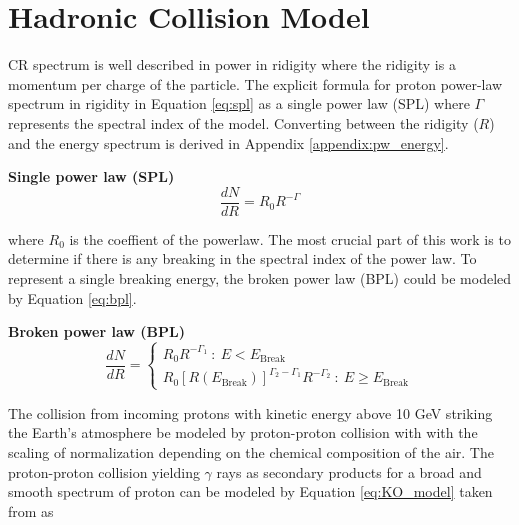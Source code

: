 \section{Hadronic Collision Model}
CR spectrum is well described in power in ridigity where 
the ridigity is a momentum per charge of the particle.
The explicit formula for proton power-law spectrum in rigidity
in Equation \ref{eq:spl} as a single power law (SPL)
where $\Gamma$ represents the spectral index of the model. 
Converting between the ridigity ($R$) and the 
energy spectrum is derived in Appendix \ref{appendix:pw_energy}.


\textbf{Single power law (SPL)}
\begin{equation}
    \frac{dN}{dR} = R_0R^{-\Gamma}
    \label{eq:spl}
\end{equation}

where $R_0$ is the coeffient of the powerlaw.
The most crucial part of this work is to determine if there is any 
breaking in the spectral index of the power law. To represent 
a single breaking energy, the broken power law (BPL) could be modeled 
by Equation \ref{eq:bpl}. 


\textbf{Broken power law (BPL)}
\begin{equation}
\frac{dN}{dR}=
  \begin{cases}
    R_0R^{-\Gamma_1}\ :\ E < E_{\text{Break}}\\
    R_0[R(E_{\text{Break}})]^{\Gamma_2-\Gamma_1}R^{-\Gamma_2}\ :\ E \ge E_{\text{Break}}
  \end{cases}
  \label{eq:bpl}
\end{equation}

The collision from incoming protons with kinetic 
energy above 10 GeV striking the Earth's atmosphere
be modeled by proton-proton collision with 
with the scaling of normalization depending
on the chemical composition of the air.
The proton-proton collision yielding $\gamma$ rays
as secondary products for a broad and smooth spectrum
of proton can be modeled by Equation \ref{eq:KO_model}
taken from \cite{K&Omodel} as 

